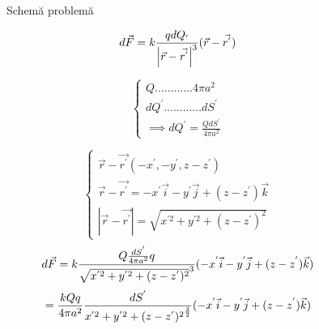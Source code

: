 \documentclass[12pt]{article}
\begin{document}
\begin{figure}[H]
    \centering
    \noindent
    \begin{center}
        \centering
        \caption{Schemă problemă}
        \label{fig:circle_ellipse_vectors}
    \end{center}
    \hfill
\end{figure}

\begin{equation}
    d\vec{F} = k \frac{ q dQ_{'} }{ \left| \vec{r} - \vec{r^{'}} \right|^{3} } ( \vec{r} - \vec{r^{'}} )\\
\end{equation}

\begin{equation}
    \begin{cases}
        Q     ............ 4\pi a^{2}\\
        dQ^{'}............ dS^{'} \\
        \implies dQ^{'} = \frac{Q dS^{'}}{4\pi a^{2}}
    \end{cases}
\end{equation}

\begin{equation}
    \begin{cases}
        \vec{r} - \vec{r^{'}}(-x^{'},-y^{'},z-z^{'})\\
        \vec{r} - \vec{r^{'}} = -x^{'}\vec{i} - y^{'}\vec{j} + (z-z^{'})\vec{k}\\
        \left| \vec{r} - \vec{r^{'}} \right| = \sqrt{x^{'2} + y^{'2} + (z-z^{'})^{2}}
    \end{cases}
\end{equation}
\begin{equation}
d\vec{F} = k \frac{ Q\frac{ dS^{'} }{ 4\pi a^{2} }q }{ {\sqrt{x^{'2} + y^{'2} + (z-z^{'})^{2}}}^{3} } (-x^{'}\vec{i} - y^{'}\vec{j} + (z-z^{'})\vec{k})\\
\end{equation}
\begin{equation}
= \frac{ kQq }{ 4\pi a^{2} } \frac{ dS^{'} }{ {{x^{'2} + y^{'2} + (z-z^{'})^{2}}}^{\frac{3}{2}} } (-x^{'}\vec{i} - y^{'}\vec{j} + (z-z^{'})\vec{k})\\
\end{equation}
\end{document}
